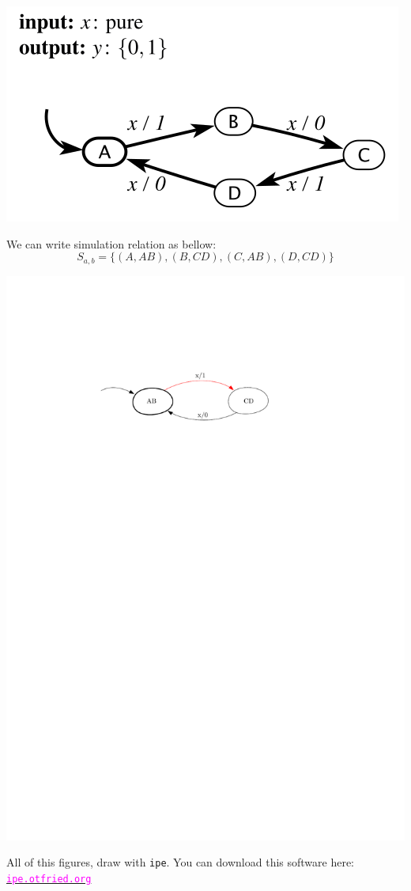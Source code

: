 \documentclass[12pt]{article}
\begin{document}
\begin{center}
	\includegraphics*[width=0.5\linewidth]{images/img2}
\end{center}


\begin{qsolve}
	We can write simulation relation as bellow:
	$$ S_{a,b}=\{ (A,AB), (B,CD), (C,AB), (D,CD)  \} $$
	
	\begin{center}
		\includegraphics*[width=0.5\linewidth]{images/Q5//Q5.pdf}
	\end{center}
	
\end{qsolve}
\vfil
\clearpage






\vspace*{\fill}
\begin{center}
	\makeendpage
	All of this figures, draw with \texttt{ipe}. You can download this software here:\\
	\href{https://ipe.otfried.org/}{\textcolor{magenta}{\texttt{ipe.otfried.org}}}

\end{center}
\vfill %
\clearpage
\end{document}
